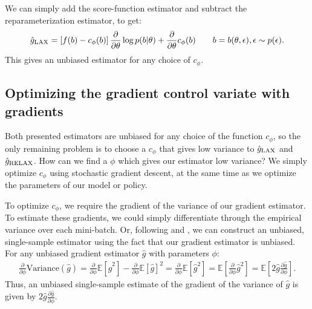 \documentclass{article}
\newcommand{\E}{\mathbb{E}}
\newcommand{\PT}{\frac{\partial}{\partial \theta}}
\newcommand{\PPH}{\frac{\partial}{\partial \phi}}
\newcommand{\LP}[1]{\PT \log p(#1)}
\newcommand{\LAX}{{\textnormal{LAX}}}
\newcommand{\RELAX}{{\textnormal{RELAX}}}
\begin{document}
%
%
%
We can simply add the score-function estimator and subtract the reparameterization estimator, to get:
%
\begin{align}
\label{eq:cont_est}
\hat g_\LAX = \left[ f(b) -c_\phi(b) \right] \PT \log p(b|\theta) + \PT c_\phi(b) \qquad b = b(\theta, \epsilon), \epsilon \sim p(\epsilon).
\end{align}
%
This gives an unbiased estimator for any choice of $c_\phi$.

\subsection{Optimizing the gradient control variate with gradients}
Both presented estimators are unbiased for any choice of the function $c_\phi$, so the only remaining problem is to choose a $c_\phi$ that gives low variance to $\hat g_\LAX$ and $\hat g_\RELAX{}$.
How can we find a $\phi$ which gives our estimator low variance?
We simply optimize $c_\phi$ using stochastic gradient descent, at the same time as we optimize the parameters of our model or policy.

To optimize $c_\phi$, we require the gradient of the variance of our gradient estimator.
To estimate these gradients, we could simply differentiate through the empirical variance over each mini-batch.
Or, following \cite{tucker2017rebar} and \cite{ruiz2016overdispersed}, we can construct an unbiased, single-sample estimator using the fact that our gradient estimator is unbiased.
For any unbiased gradient estimator $\hat g$ with parameters $\phi$:
%
\begin{align}
\PPH \text{Variance}(\hat g)
= \PPH \E[\hat g^2] - \PPH \E[\hat g]^2
= \PPH \E[\hat g^2]
= \E \left[ \PPH \hat g^2 \right]
= \E \left[ 2 \hat g \frac{\partial \hat g}{\partial \phi} \right].
\label{eq:vargrad}
\end{align}  %
%
Thus, an unbiased single-sample estimate of the gradient of the variance of $\hat g$ is given by {$2 \hat g \frac{\partial \hat g}{\partial \phi}$}.
\end{document}
